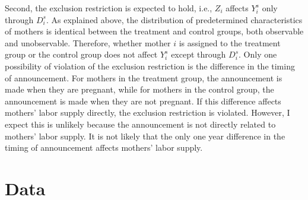 \documentclass[12pt]{article}
\begin{document}
Second, the exclusion restriction is expected to hold, i.e., $Z_i$ affects $Y_i^s$ only through $D_i^s$.
As explained above, the distribution of predetermined characteristics of mothers is identical between the treatment and control groups, both observable and unobservable.
Therefore, whether mother $i$ is assigned to the treatment group or the control group does not affect $Y_i^s$ except through $D_i^s$.
Only one possibility of violation of the exclusion restriction is the difference in the timing of announcement. 
For mothers in the treatment group, the announcement is made when they are pregnant, while for mothers in the control group, the announcement is made when they are not pregnant.
If this difference affects mothers' labor supply directly, the exclusion restriction is violated.
However, I expect this is unlikely because the announcement is not directly related to mothers' labor supply.
It is not likely that the only one year difference in the timing of announcement affects mothers' labor supply.

\section{Data}



\nocite{*}


\end{document}
